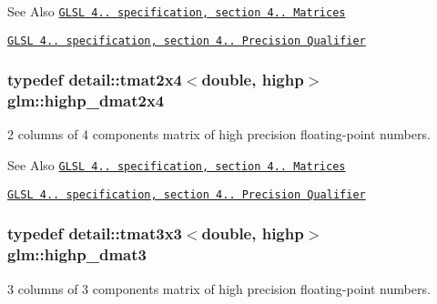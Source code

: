 \begin{DoxySeeAlso}{See Also}
\href{http://www.opengl.org/registry/doc/GLSLangSpec.4.20.8.pdf}{\tt G\-L\-S\-L 4.. specification, section 4.. Matrices} 

\href{http://www.opengl.org/registry/doc/GLSLangSpec.4.20.8.pdf}{\tt G\-L\-S\-L 4.. specification, section 4.. Precision Qualifier} 
\end{DoxySeeAlso}
\hypertarget{group__core__precision_gacd51d8188f7d66a83c035b8c4cd69f2d}{
\subsubsection[{highp\-\_\-dmat2x4}]{\setlength{\rightskip}{0pt plus 5cm}typedef detail\-::tmat2x4$<$double, highp$>$ {\bf glm\-::highp\-\_\-dmat2x4}}}\label{group__core__precision_gacd51d8188f7d66a83c035b8c4cd69f2d}
2 columns of 4 components matrix of high precision floating-\/point numbers.

\begin{DoxySeeAlso}{See Also}
\href{http://www.opengl.org/registry/doc/GLSLangSpec.4.20.8.pdf}{\tt G\-L\-S\-L 4.. specification, section 4.. Matrices} 

\href{http://www.opengl.org/registry/doc/GLSLangSpec.4.20.8.pdf}{\tt G\-L\-S\-L 4.. specification, section 4.. Precision Qualifier} 
\end{DoxySeeAlso}
\hypertarget{group__core__precision_ga993461e1d2caf19abd4f64d02ccdafa9}{
\subsubsection[{highp\-\_\-dmat3}]{\setlength{\rightskip}{0pt plus 5cm}typedef detail\-::tmat3x3$<$double, highp$>$ {\bf glm\-::highp\-\_\-dmat3}}}\label{group__core__precision_ga993461e1d2caf19abd4f64d02ccdafa9}
3 columns of 3 components matrix of high precision floating-\/point numbers.

